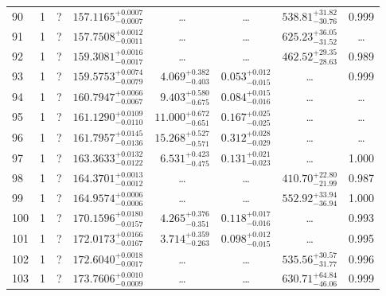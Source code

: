 \begin{table*}[!]
\begin{tabular}{llcrrlrc}
90 & 1 & ? & $    157.1165_{-      0.0007}^{+      0.0007}$ & \multicolumn{1}{c}{\dots} & \multicolumn{1}{c}{\dots} & $      538.81_{-       30.76}^{+       31.82}$ & 0.999\\[1pt]
91 & 1 & ? & $    157.7508_{-      0.0011}^{+      0.0012}$ & \multicolumn{1}{c}{\dots} & \multicolumn{1}{c}{\dots} & $      625.23_{-       31.52}^{+       36.05}$ & \dots \\[1pt]
92 & 1 & ? & $    159.3081_{-      0.0017}^{+      0.0016}$ & \multicolumn{1}{c}{\dots} & \multicolumn{1}{c}{\dots} & $      462.52_{-       28.63}^{+       29.35}$ & 0.989\\[1pt]
93 & 1 & ? & $    159.5753_{-      0.0079}^{+      0.0074}$ & $       4.069_{-       0.403}^{+       0.382}$ & $       0.053_{-       0.015}^{+       0.012}$ & \multicolumn{1}{c}{\dots} & 0.999\\[1pt]
94 & 1 & ? & $    160.7947_{-      0.0067}^{+      0.0066}$ & $       9.403_{-       0.675}^{+       0.580}$ & $       0.084_{-       0.016}^{+       0.015}$ & \multicolumn{1}{c}{\dots} & \dots \\[1pt]
95 & 1 & ? & $    161.1290_{-      0.0110}^{+      0.0109}$ & $      11.000_{-       0.651}^{+       0.672}$ & $       0.167_{-       0.025}^{+       0.025}$ & \multicolumn{1}{c}{\dots} & \dots \\[1pt]
96 & 1 & ? & $    161.7957_{-      0.0136}^{+      0.0145}$ & $      15.268_{-       0.571}^{+       0.527}$ & $       0.312_{-       0.029}^{+       0.028}$ & \multicolumn{1}{c}{\dots} & \dots \\[1pt]
97 & 1 & ? & $    163.3633_{-      0.0122}^{+      0.0132}$ & $       6.531_{-       0.475}^{+       0.423}$ & $       0.131_{-       0.023}^{+       0.021}$ & \multicolumn{1}{c}{\dots} & 1.000\\[1pt]
98 & 1 & ? & $    164.3701_{-      0.0012}^{+      0.0013}$ & \multicolumn{1}{c}{\dots} & \multicolumn{1}{c}{\dots} & $      410.70_{-       21.99}^{+       22.80}$ & 0.987\\[1pt]
99 & 1 & ? & $    164.9574_{-      0.0006}^{+      0.0006}$ & \multicolumn{1}{c}{\dots} & \multicolumn{1}{c}{\dots} & $      552.92_{-       36.94}^{+       33.94}$ & 1.000\\[1pt]

100 & 1 & ? & $    170.1596_{-      0.0157}^{+      0.0180}$ & $       4.265_{-       0.351}^{+       0.376}$ & $       0.118_{-       0.016}^{+       0.017}$ & \multicolumn{1}{c}{\dots} & 0.993\\[1pt]
101 & 1 & ? & $    172.0173_{-      0.0167}^{+      0.0166}$ & $       3.714_{-       0.263}^{+       0.359}$ & $       0.098_{-       0.015}^{+       0.012}$ & \multicolumn{1}{c}{\dots} & 0.995\\[1pt]
102 & 1 & ? & $    172.6040_{-      0.0017}^{+      0.0018}$ & \multicolumn{1}{c}{\dots} & \multicolumn{1}{c}{\dots} & $      535.56_{-       31.77}^{+       30.57}$ & 0.996\\[1pt]
103 & 1 & ? & $    173.7606_{-      0.0009}^{+      0.0010}$ & \multicolumn{1}{c}{\dots} & \multicolumn{1}{c}{\dots} & $      630.71_{-       46.06}^{+       64.84}$ & 0.999\\[1pt]


\end{tabular}
\end{table*}
